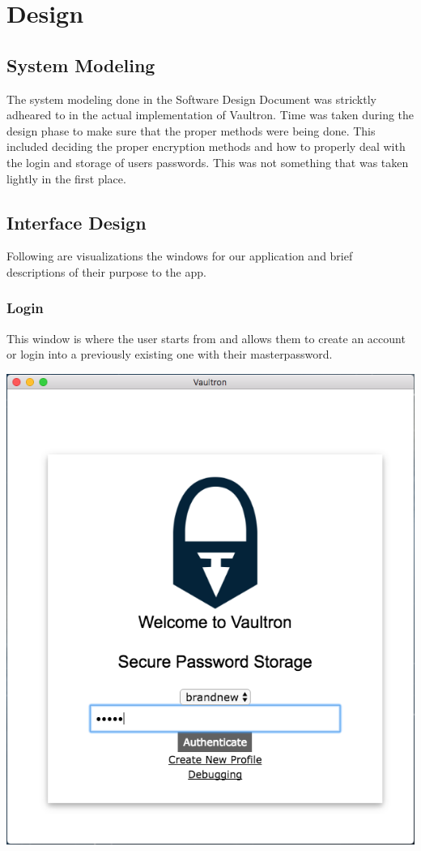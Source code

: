 \documentclass[11pt]{report}
\begin{document}
    \nocite{*}
    \printbibliography[heading=none]




\chapter{Design}

\section{System Modeling}
The system modeling done in the Software Design Document was stricktly
adheared to in the actual implementation of Vaultron. Time was taken
during the design phase to make sure that the proper methods were
being done. This included deciding the proper encryption methods and
how to properly deal with the login and storage of users passwords.
This was not something that was taken lightly in the first place.



\section{Interface Design}
Following are visualizations the windows for our application and brief 
descriptions of their purpose to the app.

\subsection{Login}
This window is where the user starts from and allows them to create an account
or login into a previously existing one with their masterpassword.

\begin{center}
\includegraphics[scale=0.50]{app-login-demo.png}
\end{center}
\end{document}
